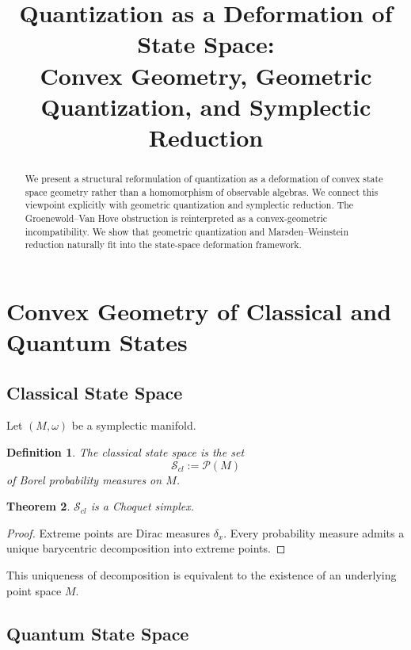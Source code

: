 \documentclass[11pt]{article}
\title{Quantization as a Deformation of State Space:\\
Convex Geometry, Geometric Quantization, and Symplectic Reduction}
\author{}
\date{}
\newtheorem{theorem}{Theorem}[section]
\newtheorem{definition}[theorem]{Definition}
\begin{document}
\maketitle

\begin{abstract}
We present a structural reformulation of quantization as a deformation
of convex state space geometry rather than a homomorphism of observable algebras.
We connect this viewpoint explicitly with geometric quantization
and symplectic reduction.
The Groenewold--Van Hove obstruction is reinterpreted as
a convex-geometric incompatibility.
We show that geometric quantization and Marsden--Weinstein reduction
naturally fit into the state-space deformation framework.
\end{abstract}

\tableofcontents

\section{Convex Geometry of Classical and Quantum States}

\subsection{Classical State Space}

Let $(M,\omega)$ be a symplectic manifold.

\begin{definition}
The classical state space is the set
\[
\mathcal{S}_{cl} := \mathcal{P}(M)
\]
of Borel probability measures on $M$.
\end{definition}

\begin{theorem}
$\mathcal{S}_{cl}$ is a Choquet simplex.
\end{theorem}

\begin{proof}
Extreme points are Dirac measures $\delta_x$.
Every probability measure admits a unique barycentric decomposition
into extreme points.
\end{proof}

This uniqueness of decomposition is equivalent to the existence of
an underlying point space $M$.

\subsection{Quantum State Space}
\end{document}
